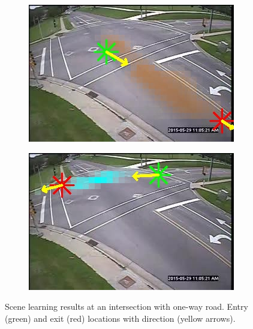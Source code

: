 \begin{figure}
        \begin{subfigure}{0.32\linewidth}
            \includegraphics[width=\linewidth]{./img/scene_learning/res/244458/244458-2.jpg}
        \end{subfigure}
        \begin{subfigure}{0.32\linewidth}
            \includegraphics[width=\linewidth]{./img/scene_learning/res/244458/244458-3.jpg}
        \end{subfigure}
        \caption{Scene learning results at an intersection with one-way road. Entry (green) and exit (red) locations with direction (yellow arrows).}
        \label{fig:entry-exit-full-1}
\end{figure}

